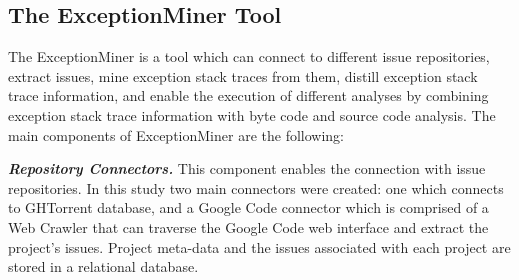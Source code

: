 \documentclass[conference]{IEEEtran}
\begin{document}




\subsection{The ExceptionMiner Tool}
\label{sec:exceptionminer}

The ExceptionMiner is a tool which can connect to different issue repositories, 
extract issues, mine exception stack traces from them, distill exception stack trace information,
and enable the execution of different analyses by combining exception stack 
trace information with byte code and source code analysis. The main components of ExceptionMiner are the following:

\emph{\textbf{Repository Connectors.}} This component enables the connection 
with issue repositories. In this study two main connectors were created: one which connects to 
GHTorrent database, and a Google Code connector which is comprised of a Web Crawler
 that can traverse the Google Code web interface and extract the project's issues. 
Project meta-data and the issues associated with each project are stored in a relational 
database.
\end{document}
